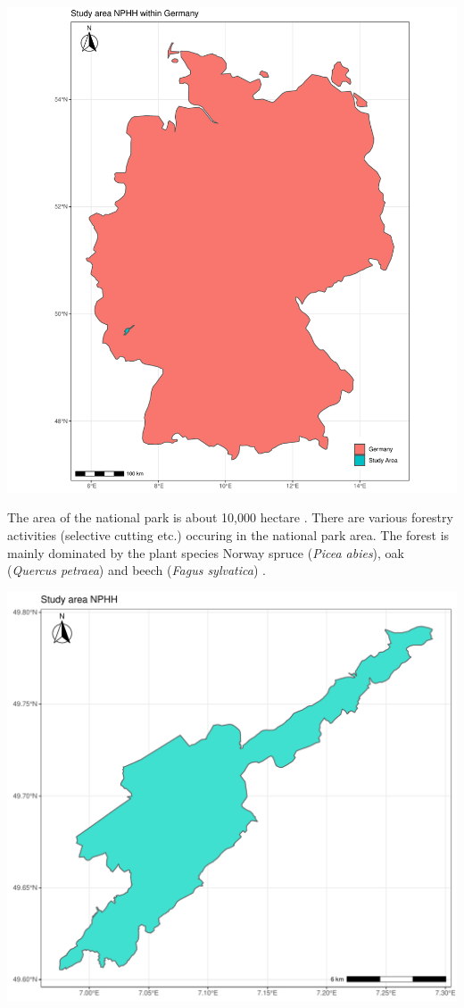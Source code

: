 \documentclass[a4paper, twoside]{templates/ociamthesis}
\let\origfigure\figure
\let\endorigfigure\endfigure
\renewenvironment{figure}[1][2] {
    \expandafter\origfigure\expandafter[H]
} {
    \endorigfigure
}
\begin{document}
\begin{figure}
\includegraphics[width=0.9\linewidth]{./figures/map_germany} \caption{The study area on Germany's map.}\label{fig:germanmap}
\end{figure}

The area of the national park is about 10,000 hectare \citep{fischer2016scientific}. There are various forestry activities (selective cutting etc.) occuring in the national park area. The forest is mainly dominated by the plant species Norway spruce (\emph{Picea abies}), oak (\emph{Quercus petraea}) and beech (\emph{Fagus sylvatica}) \citep{buddenbaum2015nationalpark}.

\newpage

\begin{figure}
\includegraphics[width=0.9\linewidth]{./figures/map_np} \caption{The study area.}\label{fig:npmap}
\end{figure}
\end{document}

